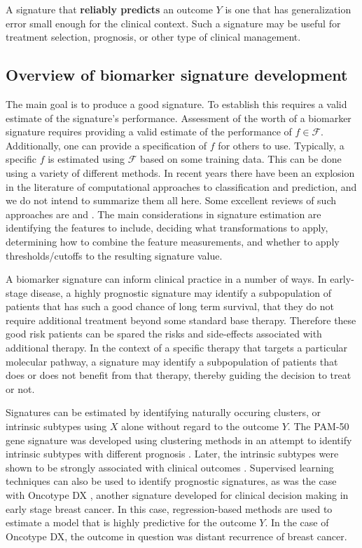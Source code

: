 \documentclass[12pt,]{article}
\begin{document}
A signature that \textbf{reliably predicts} an outcome \(Y\) is one that
has generalization error small enough for the clinical context. Such a
signature may be useful for treatment selection, prognosis, or other
type of clinical management.

\subsection{Overview of biomarker signature
development}\label{overview-of-biomarker-signature-development}

The main goal is to produce a good signature. To establish this requires
a valid estimate of the signature's performance. Assessment of the worth
of a biomarker signature requires providing a valid estimate of the
performance of \(f \in \mathcal{F}\). Additionally, one can provide a
specification of \(f\) for others to use. Typically, a specific \(f\) is
estimated using \(\mathcal{F}\) based on some training data. This can be
done using a variety of different methods. In recent years there have
been an explosion in the literature of computational approaches to
classification and prediction, and we do not intend to summarize them
all here. Some excellent reviews of such approaches are
\citet{hastie2009elements} and \citet{moons2012riskI}. The main
considerations in signature estimation are identifying the features to
include, deciding what transformations to apply, determining how to
combine the feature measurements, and whether to apply
thresholds/cutoffs to the resulting signature value.

A biomarker signature can inform clinical practice in a number of ways.
In early-stage disease, a highly prognostic signature may identify a
subpopulation of patients that has such a good chance of long term
survival, that they do not require additional treatment beyond some
standard base therapy. Therefore these good risk patients can be spared
the risks and side-effects associated with additional therapy. In the
context of a specific therapy that targets a particular molecular
pathway, a signature may identify a subpopulation of patients that does
or does not benefit from that therapy, thereby guiding the decision to
treat or not.

Signatures can be estimated by identifying naturally occuring clusters,
or intrinsic subtypes using \(X\) alone without regard to the outcome
\(Y\). The PAM-50 gene signature was developed using clustering methods
in an attempt to identify intrinsic subtypes with different prognosis
\citep{parker2009supervised}. Later, the intrinsic subtypes were shown
to be strongly associated with clinical outcomes
\citep{nielsen2010comparison}. Supervised learning techniques can also
be used to identify prognostic signatures, as was the case with Oncotype
DX \citep{paik2004multigene}, another signature developed for clinical
decision making in early stage breast cancer. In this case,
regression-based methods are used to estimate a model that is highly
predictive for the outcome \(Y\). In the case of Oncotype DX, the
outcome in question was distant recurrence of breast cancer.
\end{document}
